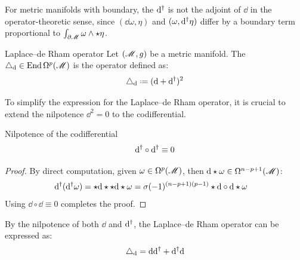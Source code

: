 For metric manifolds with boundary, the $ \mathrm{d}^\dagger $ is not the adjoint of $ \dd $ in the operator-theoretic sense, since $ (\dd \omega , \eta) $ and $ (\omega , \mathrm{d}^\dagger \eta) $ differ by a boundary term proportional to $ \int_{\partial \mathscr{M}} \omega \wedge \star \eta $.

\begin{definition}{Laplace--de Rham operator}{}
  Let $ (\mathscr{M},g) $ be a metric manifold. The  $ \triangle_{\mathrm{d}} \in \operatorname{End} \Omega^{p}(\mathscr{M}) $ is the operator defined as:
  \begin{equation}
    \lapd \defeq (\dd + \cdd)^2
  \end{equation}
\end{definition}

To simplify the expression for the Laplace--de Rham operator, it is crucial to extend the nilpotence $ \dd^2 = 0 $ to the codifferential.

\begin{lemma}[before upper = {\tcbtitle}]{Nilpotence of the codifferential}{}
  \begin{equation}
    \mathrm{d}^\dagger \circ \mathrm{d}^\dagger \equiv 0
  \end{equation}
\end{lemma}

\begin{proofbox}
  \begin{proof}
    By direct computation, given $ \omega \in \Omega^{p}(\mathscr{M}) $, then $ \mathrm{d} \star \omega \in \Omega^{n-p+1}(\mathscr{M}) $:
    \begin{equation*}
      \begin{split}
        \mathrm{d}^\dagger (\mathrm{d}^\dagger \omega)
        & = \star \mathrm{d} \star \star \mathrm{d} \star \omega = \sigma (-1)^{(n-p+1)(p-1)} \star \mathrm{d} \circ \mathrm{d} \star \omega
      \end{split}
    \end{equation*}
    Using $ \dd \circ \dd \equiv 0 $ completes the proof.
  \end{proof}
\end{proofbox}

By the nilpotence of both $ \dd $ and $ \mathrm{d}^\dagger $, the Laplace--de Rham operator can be expressed as:
\begin{equation}
  \triangle_{\mathrm{d}} = \mathrm{d} \mathrm{d}^\dagger + \mathrm{d}^\dagger \mathrm{d}
\end{equation}

